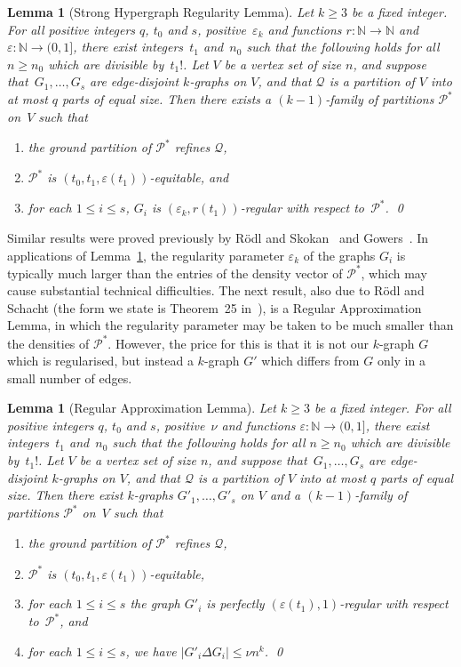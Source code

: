 \documentclass[12pt,a4paper]{amsart}
\def\itm#1{\rm ({#1})}
\def\itmit#1{\itm{\it #1\,}}
\def\abc{\itmit{\alph{*}}}
\let\eps\varepsilon
\newtheorem{lemma}[theorem] {Lemma}
\newcommand{\NATS}{\mathbb{N}}
\newcommand{\Part}{\mathcal{P}}
\newcommand{\Qart}{\mathcal{Q}}
\begin{document}
\begin{lemma}[Strong Hypergraph Regularity Lemma]\label{reglemma}
Let $k \geq 3$ be a fixed integer. For all positive integers $q$, $t_0$ and $s$,
positive~$\eps_k$ and functions $r: \NATS \rightarrow \NATS$ 
and $\eps: \NATS \rightarrow (0,1]$, there exist integers~$t_1$ 
and~$n_0$ such that the following holds for all $n \ge n_0$ which are divisible 
by~$t_1!$. Let $V$ be a vertex set of size $n$, and suppose that~$G_1,
\dots, G_s$ are edge-disjoint $k$-graphs on $V$, and that $\Qart$ is a partition
of $V$ into at most $q$ parts of equal size. Then there exists a
$(k-1)$-family of partitions $\Part^*$ on~$V$ such that
\begin{enumerate}[label=\abc]
\item the ground partition of $\Part^*$ refines $\Qart$,
\item $\Part^*$ is $(t_0,t_1, \eps(t_1))$-equitable, and 
\item for each $1 \leq i \leq s$, $G_i$ is $(\eps_k,r(t_1))$-regular with
respect to~$\Part^*$. \qed
\end{enumerate}
\end{lemma}

Similar results were proved previously by R\"odl and Skokan~\cite{RSk} and
Gowers~\cite{Gowers}. In applications of Lemma~\ref{reglemma}, the regularity parameter $\eps_k$ of the graphs $G_i$ is typically much larger than the entries of the density vector of $\Part^*$, which may cause substantial technical difficulties. The next result, also due to  
R\"odl and Schacht (the form we state is Theorem~25 in~\cite{RS}), is a Regular Approximation Lemma, in which the regularity parameter may be taken to be much smaller than the densities of $\Part^*$. However, the price for this is that it is not our $k$-graph $G$ which is regularised, but instead a $k$-graph $G'$ which differs from $G$ only in a small number of edges. 

\begin{lemma}[Regular Approximation Lemma]\label{lem:RAL}
Let $k \geq 3$ be a fixed integer. For all positive integers $q$, $t_0$ and $s$,
positive~$\nu$ and functions $\eps: \NATS \rightarrow (0,1]$, there exist integers~$t_1$ 
and~$n_0$ such that the following holds for all $n \ge n_0$ which are divisible 
by~$t_1!$. Let $V$ be a vertex set of size $n$, and suppose that~$G_1,
\dots, G_s$ are edge-disjoint $k$-graphs on $V$, and that $\Qart$ is a partition
of $V$ into at most $q$ parts of equal size. Then there exist $k$-graphs $G'_1,\ldots,G'_s$
on $V$ and a
$(k-1)$-family of partitions $\Part^*$ on~$V$ such that
\begin{enumerate}[label=\abc]
\item the ground partition of $\Part^*$ refines $\Qart$,
\item $\Part^*$ is $(t_0,t_1, \eps(t_1))$-equitable,
\item for each $1 \leq i \leq s$ the graph $G'_i$ is perfectly
$(\eps(t_1),1)$-regular with respect to~$\Part^*$, and
\item for each $1\leq i\leq s$, we have $|G'_i\Delta G_i|\le\nu n^k$. \qed
\end{enumerate}
\end{lemma}
\end{document}
